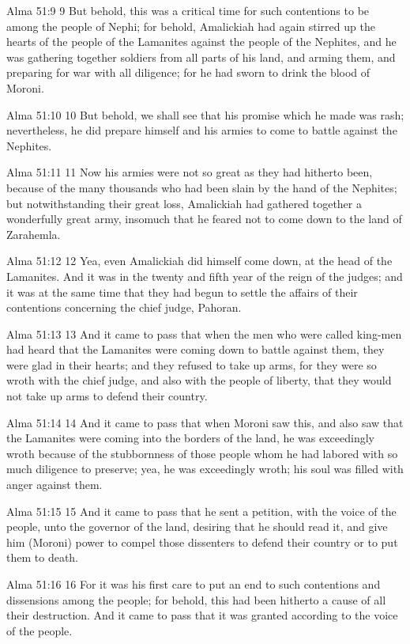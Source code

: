 Alma 51:9
 9 But behold, this was a critical time for such contentions to
be among the people of Nephi; for behold, Amalickiah had again
stirred up the hearts of the people of the Lamanites against the
people of the Nephites, and he was gathering together soldiers
from all parts of his land, and arming them, and preparing for
war with all diligence; for he had sworn to drink the blood of
Moroni.

Alma 51:10
 10 But behold, we shall see that his promise which he made was
rash; nevertheless, he did prepare himself and his armies to come
to battle against the Nephites.

Alma 51:11
 11 Now his armies were not so great as they had hitherto been,
because of the many thousands who had been slain by the hand of
the Nephites; but notwithstanding their great loss, Amalickiah
had gathered together a wonderfully great army, insomuch that he
feared not to come down to the land of Zarahemla.

Alma 51:12
 12 Yea, even Amalickiah did himself come down, at the head of
the Lamanites. And it was in the twenty and fifth year of the
reign of the judges; and it was at the same time that they had
begun to settle the affairs of their contentions concerning the
chief judge, Pahoran.

Alma 51:13
 13 And it came to pass that when the men who were called
king-men had heard that the Lamanites were coming down to battle
against them, they were glad in their hearts; and they refused to
take up arms, for they were so wroth with the chief judge, and
also with the people of liberty, that they would not take up arms
to defend their country.

Alma 51:14
 14 And it came to pass that when Moroni saw this, and also saw
that the Lamanites were coming into the borders of the land, he
was exceedingly wroth because of the stubbornness of those people
whom he had labored with so much diligence to preserve; yea, he
was exceedingly wroth; his soul was filled with anger against
them.

Alma 51:15
 15 And it came to pass that he sent a petition, with the voice
of the people, unto the governor of the land, desiring that he
should read it, and give him (Moroni) power to compel those
dissenters to defend their country or to put them to death.

Alma 51:16
 16 For it was his first care to put an end to such contentions
and dissensions among the people; for behold, this had been
hitherto a cause of all their destruction. And it came to pass
that it was granted according to the voice of the people.

